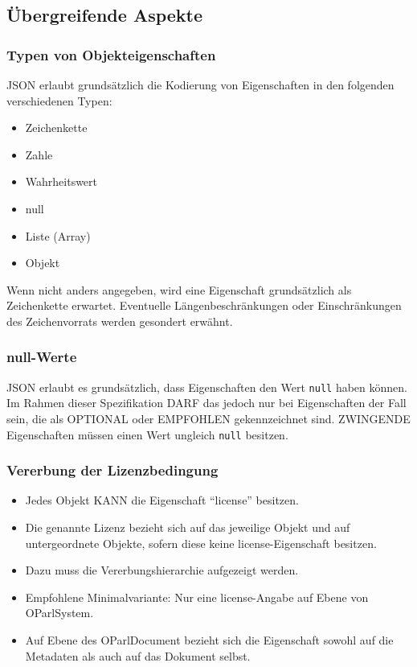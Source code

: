 \documentclass[,a4paper]{article}
\begin{document}
\subsection{Übergreifende Aspekte}

\subsubsection{Typen von Objekteigenschaften}

JSON erlaubt grundsätzlich die Kodierung von Eigenschaften in den
folgenden verschiedenen Typen:

\begin{itemize}
\item
  Zeichenkette
\item
  Zahle
\item
  Wahrheitswert
\item
  null
\item
  Liste (Array)
\item
  Objekt
\end{itemize}

Wenn nicht anders angegeben, wird eine Eigenschaft grundsätzlich als
Zeichenkette erwartet. Eventuelle Längenbeschränkungen oder
Einschränkungen des Zeichenvorrats werden gesondert erwähnt.

\subsubsection{null-Werte}

JSON erlaubt es grundsätzlich, dass Eigenschaften den Wert \texttt{null}
haben können. Im Rahmen dieser Spezifikation DARF das jedoch nur bei
Eigenschaften der Fall sein, die als OPTIONAL oder EMPFOHLEN
gekennzeichnet sind. ZWINGENDE Eigenschaften müssen einen Wert ungleich
\texttt{null} besitzen.

\subsubsection{Vererbung der Lizenzbedingung}

\begin{itemize}
\item
  Jedes Objekt KANN die Eigenschaft ``license'' besitzen.
\item
  Die genannte Lizenz bezieht sich auf das jeweilige Objekt und auf
  untergeordnete Objekte, sofern diese keine license-Eigenschaft
  besitzen.
\item
  Dazu muss die Vererbungshierarchie aufgezeigt werden.
\item
  Empfohlene Minimalvariante: Nur eine license-Angabe auf Ebene von
  OParlSystem.
\item
  Auf Ebene des OParlDocument bezieht sich die Eigenschaft sowohl auf
  die Metadaten als auch auf das Dokument selbst.
\end{itemize}
\end{document}
